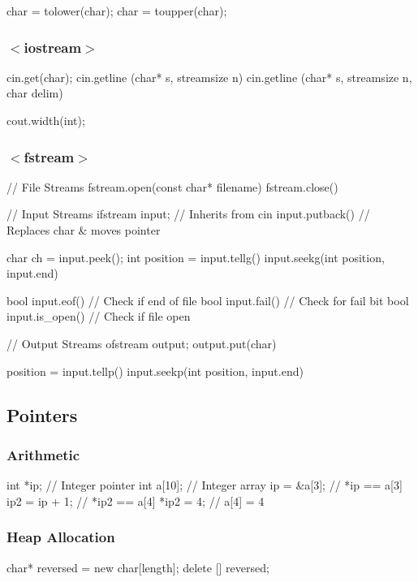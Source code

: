 \documentclass[10pt,a4paper]{extarticle}
\begin{document}
\begin{multicols}{2}
\begin{multicols}{2}
\begin{cppcode}
  char = tolower(char);
  char = toupper(char);
\end{cppcode}
\end{multicols}

\subsubsection*{$<$iostream$>$}
\begin{cppcode}
  cin.get(char);
  cin.getline (char* s, streamsize n)
  cin.getline (char* s, streamsize n, char delim)

  cout.width(int);
\end{cppcode}

\subsubsection*{$<$fstream$>$}
\begin{cppcode}
  // File Streams
  fstream.open(const char* filename)
  fstream.close()

  // Input Streams
  ifstream input; // Inherits from cin
  input.putback() // Replaces char & moves pointer

  char ch = input.peek();
  int position = input.tellg()
  input.seekg(int position, input.end)

  bool input.eof()      // Check if end of file
  bool input.fail()     // Check for fail bit
  bool input.is_open()  // Check if file open
  
  // Output Streams
  ofstream output;
  output.put(char)

  position = input.tellp()
  input.seekp(int position, input.end)
\end{cppcode}

\vfill
\columnbreak

\subsection*{Pointers}

\subsubsection*{Arithmetic}
\begin{cppcode}
  int *ip;      // Integer pointer
  int a[10];    // Integer array
  ip = &a[3];   // *ip == a[3]
  ip2 = ip + 1; // *ip2 == a[4]
  *ip2 = 4;     // a[4] = 4
\end{cppcode}

\subsubsection*{Heap Allocation}
\begin{cppcode}
  char* reversed = new char[length];
  delete [] reversed;
\end{cppcode}


\end{multicols}
\end{document}

